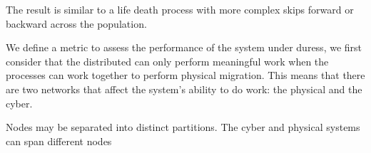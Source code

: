 The result is similar to a life death process with more complex skips forward 
or backward across the population.

We define a metric to assess the performance of the system under duress, we 
first consider that the distributed can only perform meaningful work when the 
processes can work together to perform physical migration. This means that 
there are two networks that affect the system's ability to do work: the 
physical and the cyber.

Nodes may be separated into distinct partitions. The cyber and physical systems 
can span different nodes 
